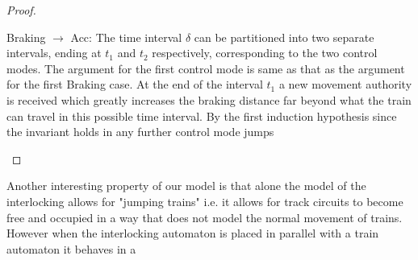 \begin{mytheorem}
\begin{proof}
\begin{description}
Braking $\to$ Acc:  The time interval $\delta$ can be partitioned into two separate intervals, ending at $t_1$ and $t_2$ respectively, corresponding to the two control modes. The argument for the first control mode is same as that as the argument for the first Braking case.  At the end of the interval $t_1$ a new movement authority is received which greatly increases the braking distance far beyond what the train can travel in this possible time interval. By the first induction hypothesis since the invariant holds in any further control mode jumps

\begin{comment}
Braking $\to$ Acc $\to$ FAS: The time interval can be partitioned into three separate intervals ending at $t_1,t_2$ and $t_3$ respectively. The invariant holds in the first two time intervals following the argument from the previous case Breaking $\to$ Acc. At the end of the Acc mode there is a transition to FAS however since there is no possibility of the train reaching the breaking point we know that the invariant continues to hold.
\end{comment}

\end{description}


\begin{comment}
Initially we are in the stop state and have $D(t) \leq EOA$. There is only one possible transition from this state. we receive a new movement authority with $D(t) < EOA$ and proceed to the accelerating state.
We have two possible cases from the accelerating state. The first case is that the train reaches the braking point and enters the braking state $D(t) = BD(t,speed)$. In this case the trains speed speed will decrease by -1 per unit of time and the train will enter the stop state $EOA$.
The second case is that the train reaches max speed and goes into the maxspeed state. If the train reaches $D(t) = BD(t,speed)$ whilst in the maxspeed state then the train will go into the braking state and the same argument holds from the previous case.
\end{comment}
\end{proof}

\end{mytheorem}


Another interesting property of our model is that alone the model of the interlocking allows for "jumping trains" i.e. it allows for track circuits to become free and occupied in a way that does not model the normal movement of trains.
However when the interlocking automaton is placed in parallel with a train automaton it behaves in a


